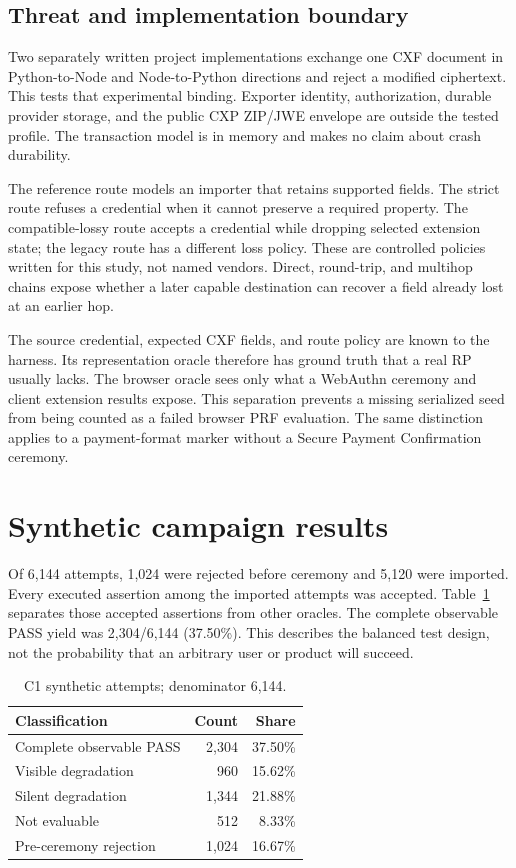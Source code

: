 \documentclass[letterpaper,twocolumn,10pt]{article}
\begin{document}
\subsection{Threat and implementation boundary}
Two separately written project implementations exchange one CXF document
in Python-to-Node and Node-to-Python directions and reject a modified
ciphertext. This tests that experimental binding. Exporter identity,
authorization, durable provider storage, and the public CXP ZIP/JWE
envelope are outside the tested profile. The transaction model is in
memory and makes no claim about crash durability.

The reference route models an importer that retains supported fields.
The strict route refuses a credential when it cannot preserve a required
property. The compatible-lossy route accepts a credential while dropping
selected extension state; the legacy route has a different loss policy.
These are controlled policies written for this study, not named vendors.
Direct, round-trip, and multihop chains expose whether a later capable
destination can recover a field already lost at an earlier hop.

The source credential, expected CXF fields, and route policy are known
to the harness. Its representation oracle therefore has ground truth that
a real RP usually lacks. The browser oracle sees only what a WebAuthn
ceremony and client extension results expose. This separation prevents a
missing serialized seed from being counted as a failed browser PRF
evaluation. The same distinction applies to a payment-format marker
without a Secure Payment Confirmation ceremony.

\section{Synthetic campaign results}
Of 6,144 attempts, 1,024 were rejected before ceremony and 5,120 were
imported. Every executed assertion among the imported attempts was
accepted. Table~\ref{tab:c1} separates those accepted assertions from other
oracles. The complete observable PASS yield was 2,304/6,144 (37.50\%).
This describes the balanced test design, not the probability that an
arbitrary user or product will succeed.

\begin{table}[t]
\centering
\caption{C1 synthetic attempts; denominator 6,144.}
\label{tab:c1}
\begin{tabular}{lrr}
\toprule
Classification & Count & Share \\
\midrule
Complete observable PASS & 2,304 & 37.50\% \\
Visible degradation & 960 & 15.62\% \\
Silent degradation & 1,344 & 21.88\% \\
Not evaluable & 512 & 8.33\% \\
Pre-ceremony rejection & 1,024 & 16.67\% \\
\bottomrule
\end{tabular}
\end{table}
\end{document}
